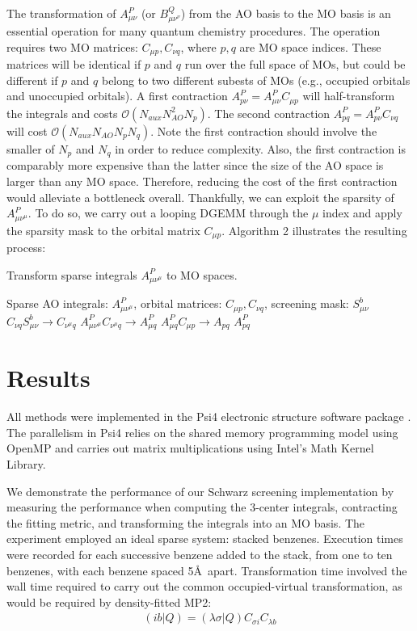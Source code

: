 The transformation of $A_{\mu \nu}^P$ (or $B_{\mu \nu^\nu}^Q$) from the AO basis to the MO basis is 
an essential operation for many quantum 
chemistry procedures. The operation requires two MO matrices: $C_{\mu p}, C_{\nu q}$, where $p, q$ are MO space
indices. These matrices will be identical if $p$ and $q$ run over the full space of MOs, but could be different if $p$ and $q$
belong to two different subests of MOs (e.g., occupied orbitals and unoccupied orbitals).
A first contraction $A_{p \nu}^P=A_{\mu \nu}^PC_{\mu p}$ will half-transform the integrals and costs 
$\mathcal{O}(N_{aux}N_{AO}^2N_p)$. The second contraction $A_{p q}^P=A_{p \nu}^PC_{\nu q}$ will cost
$\mathcal{O}(N_{aux}N_{AO}N_pN_q)$.
Note the first contraction should involve the smaller of $N_p$ and $N_q$ in order to reduce complexity. Also, the first contraction
is comparably more expensive than the latter since the size of the AO space is larger than any MO space. Therefore,
reducing the cost of the first contraction would alleviate a bottleneck overall. 
Thankfully, we can exploit the sparsity of $A_{\mu \nu^\mu}^P$.
To do so, we carry out a looping DGEMM through the $\mu$ index and apply the sparsity mask to the orbital matrix $C_{\mu p}$.
Algorithm 2 illustrates the resulting process:

\begin{algorithm}[H]
\caption{Transform sparse integrals $A_{\mu \nu^\mu}^P$ to MO spaces.}
\begin{algorithmic}
\REQUIRE Sparse AO integrals: $A_{\mu \nu^\mu}^P$, orbital matrices: $C_{\mu p}, C_{\nu q}$, screening mask: $S_{\mu \nu}^b$
    \STATE $C_{\nu q}S_{\mu \nu}^b \rightarrow C_{\nu^{\mu} q}$
    \STATE $A_{\mu \nu^{\mu}}^P C_{\nu^{\mu} q} \rightarrow A_{\mu q}^P$
\ENDFOR
\STATE $A_{\mu q}^PC_{\mu p} \rightarrow A_{p q}$
\RETURN $A_{p q}^P$
\end{algorithmic}
\end{algorithm}


\section{Results}

All methods were implemented in the {\sc Psi4} electronic structure software package \cite{Parrish:2017:3185}.
The parallelism in {\sc Psi4} relies on the shared memory programming model using OpenMP 
and carries out matrix multiplications using Intel's Math Kernel
Library. 

We demonstrate the performance of our Schwarz screening implementation 
by measuring the performance when computing the 3-center integrals, contracting the fitting metric,
and transforming the integrals into an MO basis.
The experiment employed an ideal sparse system: stacked benzenes. Execution times were recorded for each successive benzene
added to the stack, from one to ten benzenes, with each benzene spaced 5\AA\ apart.
Transformation time involved the wall time required to carry out the common occupied-virtual
transformation, as would be required by density-fitted MP2: 
\begin{align} 
(i b | Q) = (\lambda \sigma | Q) C_{\sigma i} C_{\lambda b} 
\end{align}

